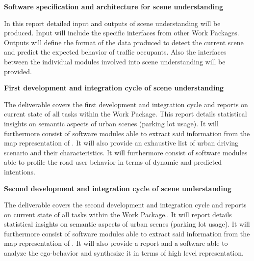 {\begin{tasks}{\WPSceneUnderstandingNo}
\end{tasks}


\begin{deliverables}{\WPSceneUnderstandingNo}

\item {\bf Software specification and architecture for scene understanding} 

In this report detailed input and outputs of scene understanding will be produced. Input will include the specific interfaces from other Work Packages. Outputs will define the format of the data produced to detect the current scene and predict the expected behavior of traffic occupants. Also the interfaces between the individual modules involved into scene understanding will be provided.

\item {\bf First development and integration cycle of scene understanding} 
	
The deliverable covers the first development and integration cycle and reports on current state of all tasks within the Work Package.
This report details statistical insights on semantic aspects of urban scenes (\eg parking lot usage). It will furthermore consist of software modules able to extract said information from the map representation of \WPMapping. 
It will also provide an exhaustive list of urban driving scenario and their characteristics. It will furthermore consist of software modules able to profile the road user behavior in terms of dynamic and predicted intentions. 

\item {\bf Second development and integration cycle of scene understanding} 
	
The deliverable covers the second development and integration cycle and reports on current state of all tasks within the Work Package..
It will report details statistical insights on semantic aspects of urban scenes (\eg parking lot usage). It will furthermore consist of software modules able to extract said information from the map representation of \WPMapping. It will also provide a report and a software able to analyze the ego-behavior and synthesize it in terms of high level representation.

\end{deliverables}

}
